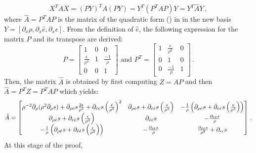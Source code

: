 \documentclass[times,doublespace]{fldauth}%
\begin{document}
%
\begin{equation}
X^T A X =  (PY)^T A (PY) = Y^T (P^T A P) Y = Y^T \hat{A} Y \, ,
\end{equation}
%
where $\hat{A} = P^T A P$ is the matrix of the quadratic form () in in the new basis $Y=\left[ \partial_x \rho, \partial_x \hat{e},  \partial_x \epsilon \right]$. From the definition of $\hat{e}$, the following expression for the matrix $P$ and its transpose are derived:
%
\begin{equation}\label{eq:jac}
P =
\begin{bmatrix}
1 & 0 & 0 \\
\frac{\epsilon}{\rho^2} & 1 & \frac{-1}{\rho} \\
0 & 0 & 1
\end{bmatrix}
\text{ and }
P^T =
\begin{bmatrix}
1 & \frac{\epsilon}{\rho^2} & 0 \\
0 & 1 & 0 \\
0 & \frac{-1}{\rho} & 1
\end{bmatrix} \, .
\end{equation}
%
Then, the matrix $\hat{A}$ is obtained by first computing $Z=AP$ and then $\hat{A} = P^T Z = P^T A P$ which yields:
%
\begin{equation}\label{eq:gen-matrix}
\hat{A} = 
\begin{bmatrix}
\rho^{-2}\partial_{\rho}(\rho^2 \partial_{\rho} s) + \partial_{\rho \hat{e}} s\frac{2 \epsilon}{\rho^2} + \partial_{\hat{e} \hat{e}} s \left(\frac{\epsilon}{\rho^2}\right)^2 &
\partial_{\rho \hat{e}} s  + \partial_{\hat{e} \hat{e}} s \left(\frac{\epsilon}{\rho^2}\right) &
-\frac{1}{\rho} \left( \partial_{\rho \hat{e}} s  + \partial_{\hat{e} \hat{e}} s \left(\frac{\epsilon}{\rho^2}\right) \right) \\
\partial_{\rho \hat{e}} s  + \partial_{\hat{e} \hat{e}} s \left(\frac{\epsilon}{\rho^2}\right) &
\partial_{\hat{e} \hat{e}} s &
-\frac{\partial_{\hat{e} \hat{e}} s}{\rho} \\
-\frac{1}{\rho} \left( \partial_{\rho \hat{e}} s  + \partial_{\hat{e} \hat{e}} s \left(\frac{\epsilon}{\rho^2}\right) \right) &
-\frac{\partial_{\hat{e} \hat{e}} s}{\rho} &
\frac{\partial_{\hat{e} \hat{e}} s}{\rho^2} + \partial_{\epsilon \epsilon} s
\end{bmatrix} \, .
\end{equation}
%
At this stage of the proof, 
%
\end{document}
